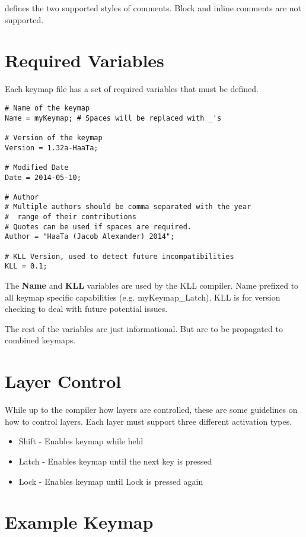 \documentclass{kiibohd-template}
\begin{document}
defines the two supported styles of comments.
Block and inline comments are not supported.


\section{Required Variables}

Each keymap file has a set of required variables that must be defined.

\begin{lstlisting}
# Name of the keymap
Name = myKeymap; # Spaces will be replaced with _'s

# Version of the keymap
Version = 1.32a-HaaTa;

# Modified Date
Date = 2014-05-10;

# Author
# Multiple authors should be comma separated with the year
#  range of their contributions
# Quotes can be used if spaces are required.
Author = "HaaTa (Jacob Alexander) 2014"; 

# KLL Version, used to detect future incompatibilities
KLL = 0.1;
\end{lstlisting}

The \textbf{Name} and \textbf{KLL} variables are used by the KLL compiler.
Name prefixed to all keymap specific capabilities (e.g. myKeymap\_Latch).
KLL is for version checking to deal with future potential issues.

The rest of the variables are just informational.
But are to be propagated to combined keymaps.


\section{Layer Control}

While up to the compiler how layers are controlled, these are some guidelines on how to control layers.
Each layer must support three different activation types.

\begin{itemize}
	\item Shift - Enables keymap while held
    \item Latch - Enables keymap until the next key is pressed
    \item Lock - Enables keymap until Lock is pressed again
\end{itemize}


\section{Example Keymap}
\end{document}
